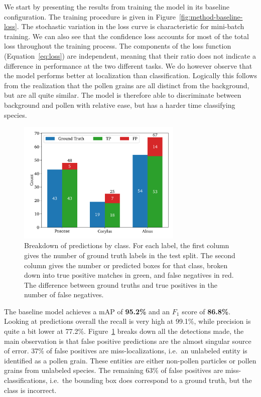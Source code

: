 We start by presenting the results from training the model in its baseline configuration. 
The training procedure is given in Figure~\ref{fig:method-baseline-loss}.
The stochastic variation in the loss curve is characteristic for mini-batch training. 
We can also see that the confidence loss accounts for most of the total loss throughout the training process.
The components of the loss function (Equation~\ref{eq:loss}) are independent, meaning that their ratio does not indicate a difference in performance at the two different tasks.
We do however observe that the model performs better at localization than classification.
Logically this follows from the realization that the pollen grains are all distinct from the background, but are all quite similar.
The model is therefore able to discriminate between background and pollen with relative ease, but has a harder time classifying species.

\begin{figure}[htb]
    \centering
    \includegraphics[width=0.7\textwidth]{figs/method/baseline/detections_test.pdf}
    \caption[Detections by type by class for the baseline on the test split]{%
Breakdown of predictions by class.
For each label, the first column gives the number of ground truth labels in the test split.
The second column gives the number or predicted boxes for that class, broken down into true positive matches in green, and false negatives in red.
The difference between ground truths and true positives in the number of false negatives. 
    }\label{fig:method-baseline-detections}
  \end{figure}

The baseline model achieves a mAP of \textbf{95.2\%} and an \(F_1\) score of \textbf{86.8\%}.
Looking at predictions overall the recall is very high at 99.1\%, while precision is quite a bit lower at 77.2\%.
Figure~\ref{fig:method-baseline-detections} breaks down all the detections made, the main observation is that false positive predictions are the almost singular source of error.
37\% of false positives are miss-localizations, i.e.~an unlabeled entity is identified as a pollen grain.
These entities are either non-pollen particles or pollen grains from unlabeled species.
The remaining 63\% of false positives are miss-classifications, i.e.~the bounding box does correspond to a ground truth, but the class is incorrect.

